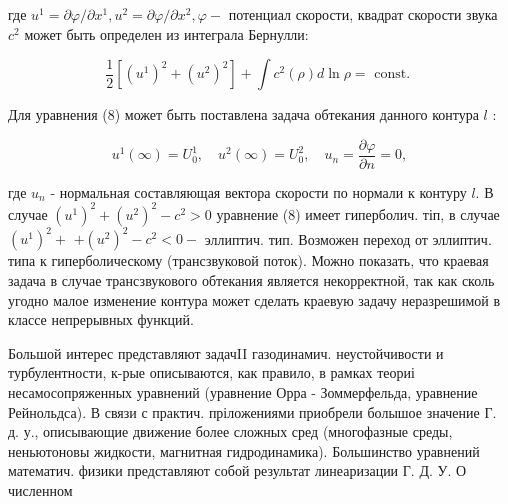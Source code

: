 \documentclass[10pt]{article}
\begin{document}
где $u^{1}=\partial \varphi / \partial x^{1}, u^{2}=\partial \varphi / \partial x^{2}, \varphi-$ потенциал скорости, квадрат скорости звука $c^{2}$ может быть определен из интеграла Бернулли:



\[

\frac{1}{2}\left[\left(u^{1}\right)^{2}+\left(u^{2}\right)^{2}\right]+\int c^{2}(\rho) d \ln \rho=\text { const. }

\]



Для уравнения (8) может быть поставлена задача обтекания данного контура $l$ :



\[

u^{1}(\infty)=U_{0}^{1}, \quad u^{2}(\infty)=U_{0}^{2}, \quad u_{n}=\frac{\partial \varphi}{\partial n}=0,

\]



где $u_{n}$ - нормальная составляющая вектора скорости по нормали к контуру $l$. В случае $\left(u^{1}\right)^{2}+\left(u^{2}\right)^{2}-c^{2}>0$ уравнение (8) имеет гиперболич. тіп, в случае $\left(u^{1}\right)^{2}+$ $+\left(u^{2}\right)^{2}-c^{2}<0-$ эллиптич. тип. Возможен переход от эллиптич. типа к гиперболическому (трансзвуковой поток). Можно показать, что краевая задача в случае трансзвукового обтекания является некорректной, так как сколь угодно малое изменение контура может сделать краевую задачу неразрешимой в классе непрерывных функций.



Большой интерес представляют задачII газодинамич. неустойчивости и турбулентности, к-рые описываются, как правило, в рамках теориі несамосопряженных уравнений (уравнение Орра - Зоммерфельда, уравнение Рейнольдса). В связи с практич. пріложениями приобрели болышое значение Г. д. у., описывающие движение более сложных сред (многофазные среды, неньютоновы жидкости, магнитная гидродинамика). Большинство уравнений математич. физики представляют собой результат линеаризации Г. Д. У. О численном
\end{document}
